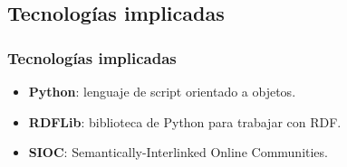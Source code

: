 \documentclass[spanish,notes=hide]{beamer}
\begin{document}
\subsection{Tecnologías implicadas}
\frame
{
  \frametitle{Tecnologías implicadas}

  \begin{itemize}
    \item<2-> \textbf{Python}: lenguaje de script orientado a objetos.
    \item<3-> \textbf{RDFLib}: biblioteca de Python para trabajar con RDF.
    \item<4-> \textbf{SIOC}: Semantically-Interlinked Online Communities.
  \end{itemize}

  \begin{center}
  \end{center}
}
\end{document}
